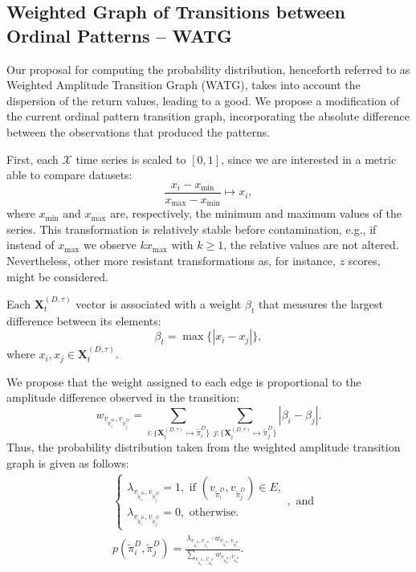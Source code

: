 \documentclass[journal]{IEEEtran}
\begin{document}
\subsection{Weighted Graph of Transitions between Ordinal Patterns -- WATG}\label{WATG}

Our proposal for computing the probability distribution, henceforth referred to as Weighted Amplitude Transition Graph (WATG), takes into account the dispersion of the return values, leading to a good.
We propose a modification of the current ordinal pattern transition graph, incorporating the absolute difference between the observations that produced the patterns.

First, each $\mathcal{X}$ time series is scaled to $[0, 1]$, since we are interested in a metric able to compare datasets:
\begin{equation}
\frac{x_i - x_{\min}}{x_{\max} - x_{\min}} \longmapsto x_i,
\end{equation}
where $x_{\min}$ and $x_{\max}$ are, respectively, the minimum and maximum values of the series.
This transformation is relatively stable before contamination, e.g., if instead of $x_{\max}$ we observe $k x_{\max}$ with $k\geq 1$, the relative values are not altered. Nevertheless, other more resistant transformations as, for instance, $z$ scores, might be considered.

Each $\mathbf{X}^{(D, \tau)}_t$ vector is associated with a weight $\beta_t$ that measures the largest difference between its elements:
\begin{equation}
\beta_t = \max\{|x_i - x_j|\},
\end{equation}
where $x_i, x_j \in \mathbf{X}^{(D, \tau)}_t$.

We propose that the weight assigned to each edge is proportional to the amplitude difference observed in the transition:	
\begin{equation}
w_{v_{\widetilde \pi^D_i}, v_{\widetilde \pi^D_j}} =  \sum_{i : \{\mathbf{X}^{(D,\tau)}_t \mapsto \widetilde\pi^D_i\}} \sum_{j : \{\mathbf{X}^{(D,\tau)}_t \mapsto \widetilde\pi^D_j\}} |\beta_i - \beta_j| .
\end{equation}
Thus, the probability distribution taken from the weighted amplitude transition graph is given as follows:	
\begin{align}
&\left\{\begin{array}{l}
\lambda_{v_{\widetilde\pi^D_i}, v_{\widetilde\pi^D_j}} = 1, \text{ if } (v_{\widetilde\pi^D_i}, v_{\widetilde\pi^D_j}) \in {E}, \\
\lambda_{v_{\widetilde\pi^D_i}, v_{\widetilde\pi^D_j}} = 0, \text{ otherwise}.
\end{array}\right., \text{ and} \\
&p(\widetilde\pi^D_i, \widetilde\pi^D_j) = \frac{\lambda_{v_{\widetilde\pi^D_i}, v_{\widetilde\pi^D_j}} \cdot w_{v_{\widetilde\pi^D_i}, v_{\widetilde\pi^D_j}}}{\sum_{v_{\widetilde\pi^D_a}, v_{\widetilde\pi^D_b}} w_{v_{\widetilde\pi^D_a}, v_{\widetilde\pi^D_b}}}.
\end{align}
\end{document}
